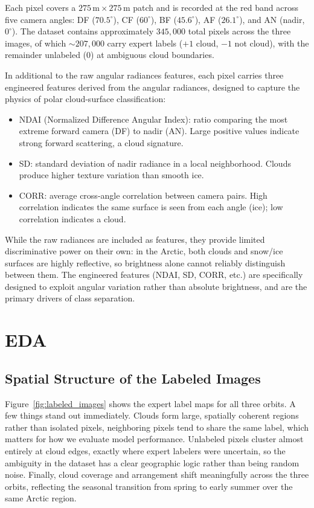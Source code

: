 \documentclass[10pt,letterpaper]{article}
\begin{document}
Each pixel covers a $275\,\text{m} \times 275\,\text{m}$ patch and is recorded at the red band across five camera angles: DF ($70.5^\circ$), CF ($60^\circ$), BF ($45.6^\circ$), AF ($26.1^\circ$), and AN (nadir, $0^\circ$). The dataset contains approximately $345{,}000$ total pixels across the three images, of which $\sim 207{,}000$ carry expert labels ($+1$ cloud, $-1$ not cloud), with the remainder unlabeled ($0$) at ambiguous cloud boundaries.

In additional to the raw angular radiances features, each pixel carries three engineered features derived from the angular radiances, designed to capture the physics of polar cloud-surface classification:

\begin{itemize}
    \item NDAI (Normalized Difference Angular Index): ratio comparing the most extreme forward camera (DF) to nadir (AN). Large positive values indicate strong forward scattering, a cloud signature.
    \item SD: standard deviation of nadir radiance in a local neighborhood. Clouds produce higher texture variation than smooth ice.
    \item CORR: average cross-angle correlation between camera pairs. High correlation indicates the same surface is seen from each angle (ice); low correlation indicates a cloud.
\end{itemize}

While the raw radiances are included as features, they provide limited discriminative power on their own: in the Arctic, both clouds and snow/ice surfaces are highly reflective, so brightness alone cannot reliably distinguish between them. The engineered features (NDAI, SD, CORR, etc.) are specifically designed to exploit angular variation rather than absolute brightness, and are the primary drivers of class separation.

\section{EDA}

\subsection{Spatial Structure of the Labeled Images}

Figure~\ref{fig:labeled_images} shows the expert label maps for all three orbits. A few things stand out immediately. Clouds form large, spatially coherent regions rather than isolated pixels, neighboring pixels tend to share the same label, which matters for how we evaluate model performance. Unlabeled pixels cluster almost entirely at cloud edges, exactly where expert labelers were uncertain, so the ambiguity in the dataset has a clear geographic logic rather than being random noise. Finally, cloud coverage and arrangement shift meaningfully across the three orbits, reflecting the seasonal transition from spring to early summer over the same Arctic region.
\end{document}
